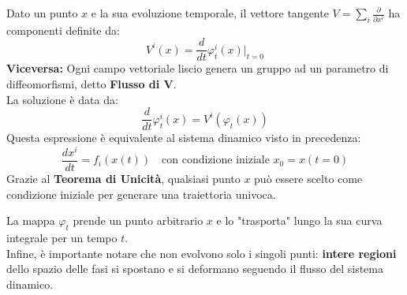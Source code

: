 \documentclass[openany]{book}
\theoremstyle{definition}
\theoremstyle{remark}
\begin{document}
\begin{center}
\end{center}
Dato un punto $x$ e la sua evoluzione temporale, il vettore tangente $V = \sum_i \frac{\partial}{\partial x^i}$ ha componenti definite da:
\[
V^i(x) = \frac{d}{dt} \varphi_t^i(x) \Big|_{t=0}
\]
\textbf{Viceversa:} Ogni campo vettoriale liscio genera un gruppo ad un parametro di diffeomorfismi, detto \textbf{Flusso di V}.\\
La soluzione è data da:
\begin{equation}
    \frac{d}{dt} \varphi_t^i(x) = V^i(\varphi_t(x))
\end{equation}
Questa espressione è equivalente al sistema dinamico visto in precedenza:
\[
\frac{dx^i}{dt} = f_i(x(t)) \quad \text{con condizione iniziale } x_0 = x(t=0)
\]
Grazie al \textbf{Teorema di Unicità}, qualsiasi punto $x$ può essere scelto come condizione iniziale per generare una traiettoria univoca.

\begin{center}
\end{center}
La mappa $\varphi_t$ prende un punto arbitrario $x$ e lo "trasporta" lungo la sua curva integrale per un tempo $t$.\\
Infine, è importante notare che non evolvono solo i singoli punti: \textbf{intere regioni} dello spazio delle fasi si spostano e si deformano seguendo il flusso del sistema dinamico.
\end{document}
